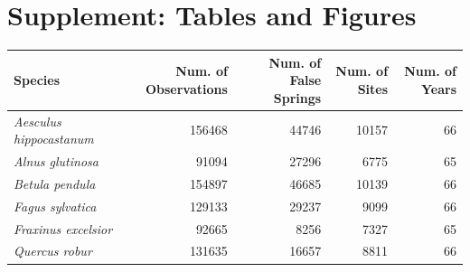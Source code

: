 \documentclass{article}\usepackage[]{graphicx}\usepackage[]{color}
\begin{document}

\newpage
\nocite{NPN2019}


\newpage
\section*{Supplement: Tables and Figures}
  
\begin{center}
 \label{tab:spp} 
\begin{tabular}{l r r r r}
\hline
Species & Num. of Observations & Num. of False Springs & Num. of Sites & Num. of Years \\
\hline
\textit{Aesculus hippocastanum} & 156468 & 44746 & 10157 & 66  \\
\textit{Alnus glutinosa} & 91094 & 27296 & 6775 & 65 \\
\textit{Betula pendula} & 154897 & 46685 & 10139 & 66 \\
\textit{Fagus sylvatica} & 129133 & 29237 & 9099 & 66 \\
\textit{Fraxinus excelsior} & 92665 & 8256 & 7327 & 65 \\
\textit{Quercus robur} & 131635 & 16657 & 8811 & 66 \\
\hline
\end{tabular}
\end{center}

\vspace{15ex}
\end{document}
